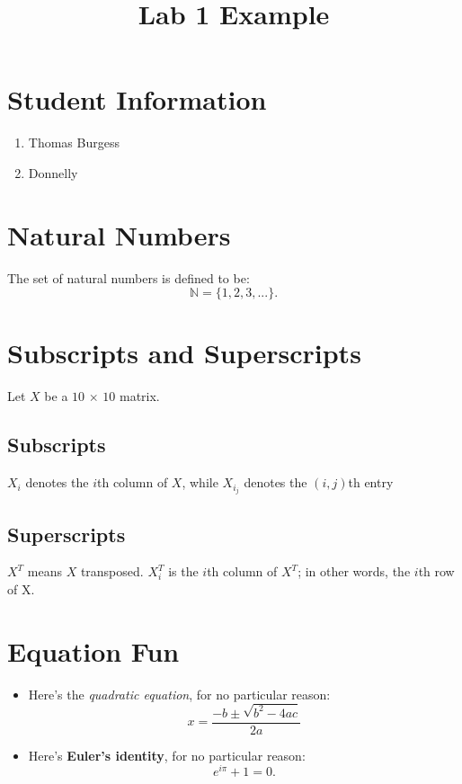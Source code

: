 \documentclass{article}
\title{Lab 1 Example}
\author{} %
\date{}   %
\begin{document}
\maketitle

\section{Student Information}
\begin{enumerate}
    \item Thomas Burgess
    \item Donnelly
\end{enumerate}

\section{Natural Numbers}
The set of natural numbers is defined to be:
\begin{equation}
\mathbb{N} = \{1,2,3,...\}.
\end{equation}

\section{Subscripts and Superscripts}
Let $X$ be a $10$ $\times$ $10$ matrix.
\subsection{Subscripts}
$X_i$ denotes the $i$th column of $X$, while $X_{i_j}$ denotes the $(i,j)$th entry
\subsection{Superscripts}
$X^T$ means $X$ transposed. $X^T_i$ is the $i$th column of $X^T$; in other words, the $i$th row of X.

\section{Equation Fun}
\begin{itemize}
    \item Here's the \emph{quadratic equation}, for no particular reason:
    \begin{equation}
    x = \frac{-b \pm \sqrt{b^2 - 4ac}}{2a}
    \end{equation}
    
\end{itemize}

\begin{itemize}
    \item Here's \textbf{Euler's identity}, for no particular reason:
    \begin{equation}
    e^{i\pi} + 1 = 0.
    \end{equation}
\end{itemize}
\end{document}
